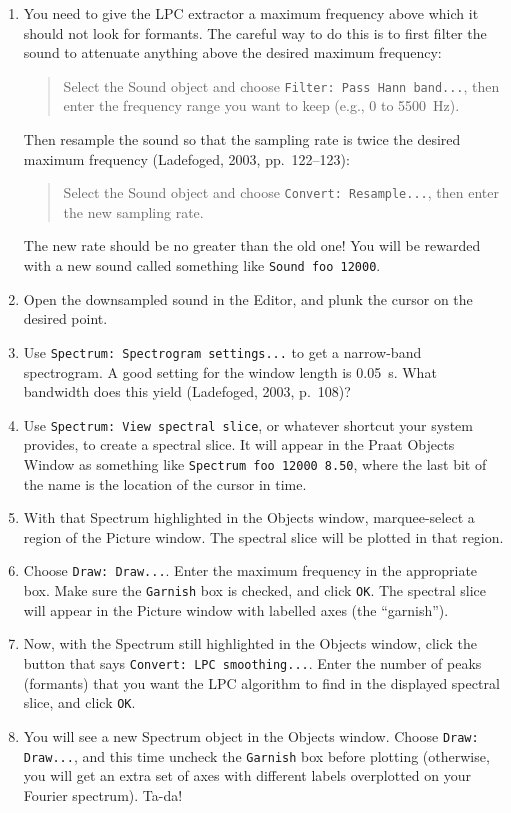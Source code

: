 \documentclass[12pt]{article}
\begin{document}
\begin{enumerate}[label=\arabic*.]
    \item You need to give the LPC extractor a maximum frequency above which it should not look for formants. The careful way to do this is to first filter the sound to attenuate anything above the desired maximum frequency:
    \begin{quote}
    Select the Sound object and choose \texttt{Filter: Pass Hann band...}, then enter the frequency range you want to keep (e.g., 0 to 5500~Hz).
    \end{quote}
    Then resample the sound so that the sampling rate is twice the desired maximum frequency (Ladefoged, 2003, pp.~122–123):
    \begin{quote}
    Select the Sound object and choose \texttt{Convert: Resample...}, then enter the new sampling rate.
    \end{quote}
    The new rate should be no greater than the old one! You will be rewarded with a new sound called something like \texttt{Sound foo 12000}.

    \item Open the downsampled sound in the Editor, and plunk the cursor on the desired point.

    \item Use \texttt{Spectrum: Spectrogram settings...} to get a narrow-band spectrogram. A good setting for the window length is 0.05~s. What bandwidth does this yield (Ladefoged, 2003, p.~108)?

    \item Use \texttt{Spectrum: View spectral slice}, or whatever shortcut your system provides, to create a spectral slice. It will appear in the Praat Objects Window as something like \texttt{Spectrum foo 12000 8.50}, where the last bit of the name is the location of the cursor in time.

    \item With that Spectrum highlighted in the Objects window, marquee-select a region of the Picture window. The spectral slice will be plotted in that region.

    \item Choose \texttt{Draw: Draw...}. Enter the maximum frequency in the appropriate box. Make sure the \texttt{Garnish} box is checked, and click \texttt{OK}. The spectral slice will appear in the Picture window with labelled axes (the “garnish”).

    \item Now, with the Spectrum still highlighted in the Objects window, click the button that says \texttt{Convert: LPC smoothing...}. Enter the number of peaks (formants) that you want the LPC algorithm to find in the displayed spectral slice, and click \texttt{OK}.

    \item You will see a new Spectrum object in the Objects window. Choose \texttt{Draw: Draw...}, and this time uncheck the \texttt{Garnish} box before plotting (otherwise, you will get an extra set of axes with different labels overplotted on your Fourier spectrum). Ta-da!
\end{enumerate}
\end{document}
